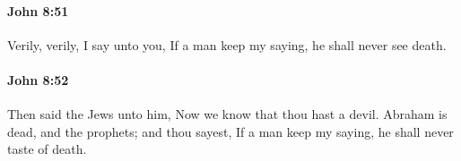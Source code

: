		\paragraph{John 8:51} %
			\label{JOHN-8-51}

			Verily, verily, I say unto you, If a man keep my saying, he shall never see death.

			\begin{framed}
				\scriptsize
				\begin{compactdesc}
					\item[SBLG] 
				\end{compactdesc}
			\end{framed}

		\paragraph{John 8:52} %
			\label{JOHN-8-52}

			Then said the Jews unto him, Now we know that thou hast a devil. Abraham is dead, and the prophets; and thou sayest, If a man keep my saying, he shall never taste of death.

